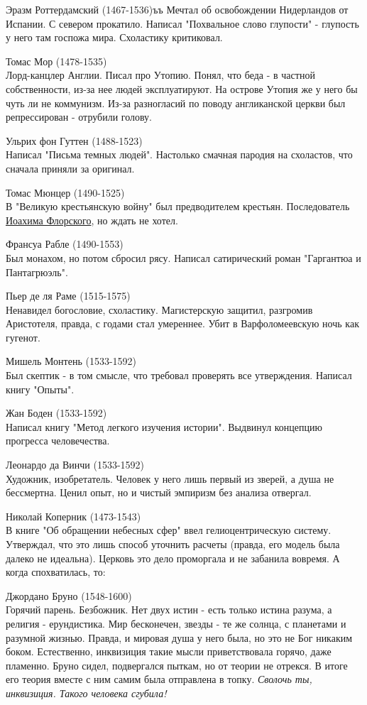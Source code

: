 \documentclass[12pt,a4paper]{article}
\begin{document}
Эразм Роттердамский (1467-1536)ъъ
Мечтал об освобождении Нидерландов от Испании. С севером прокатило. Написал "Похвальное слово глупости" - глупость у него там госпожа мира. Схоластику критиковал.

Томас Мор (1478-1535)\\
Лорд-канцлер Англии. Писал про Утопию. Понял, что беда - в частной собственности, из-за нее людей эксплуатируют. На острове Утопия же у него бы чуть ли не коммунизм. Из-за разногласий по поводу англиканской церкви был репрессирован - отрубили голову.

Ульрих фон Гуттен (1488-1523)\\
Написал "Письма темных людей". Настолько смачная пародия на схоластов, что сначала приняли за оригинал.

Томас Мюнцер (1490-1525)\\
В "Великую крестьянскую войну" был предводителем крестьян. Последователь \underline{Иоахима Флорского}, но ждать не хотел.

Франсуа Рабле (1490-1553)\\
Был монахом, но потом сбросил рясу. Написал сатирический роман "Гаргантюа и Пантагрюэль".

Пьер де ля Раме (1515-1575)\\
Ненавидел богословие, схоластику. Магистерскую защитил, разгромив Аристотеля, правда, с годами стал умереннее. Убит в Варфоломеевскую ночь как гугенот.

Мишель Монтень (1533-1592)\\
Был скептик - в том смысле, что требовал проверять все утверждения. Написал книгу "Опыты".

Жан Боден (1533-1592)\\Написал книгу "Метод легкого изучения истории". Выдвинул концепцию прогресса человечества.

Леонардо да Винчи (1533-1592)\\
Художник, изобретатель. Человек у него лишь первый из зверей, а душа не бессмертна. Ценил опыт, но и чистый эмпиризм без анализа отвергал.

Николай Коперник (1473-1543)\\
В книге "Об обращении небесных сфер" ввел гелиоцентрическую систему. Утверждал, что это лишь способ уточнить расчеты (правда, его модель была далеко не идеальна). Церковь это дело проморгала и не забанила вовремя. А когда спохватилась, то:

Джордано Бруно (1548-1600)\\
Горячий парень. Безбожник. Нет двух истин - есть только истина разума, а религия - ерундистика. Мир бесконечен, звезды - те же солнца, с планетами и разумной жизнью. Правда, и мировая душа у него была, но это не Бог никаким боком. Естественно, инквизиция такие мысли приветствовала горячо, даже пламенно. Бруно сидел, подвергался пыткам, но от теории не отрекся. В итоге его теория вместе с ним самим была отправлена в топку. \textit{Сволочь ты, инквизиция. Такого человека сгубила!}
\end{document}
